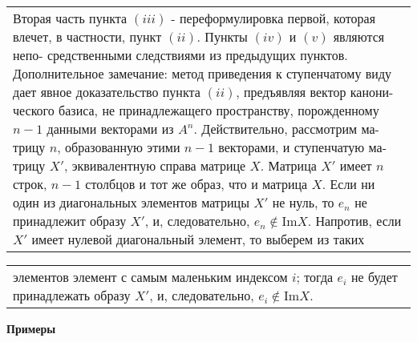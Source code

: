 \documentclass{mai_book}
\begin{document}
\begin{tabular}{|p{13cm}}
	Вторая часть пункта $(iii)$ - переформулировка первой, которая\linebreak
	влечет, в частности, пункт $(ii)$. Пункты $(iv)$ и $(v)$ являются непо-\linebreak
	средственными следствиями из предыдущих пунктов.\linebreak
	Дополнительное замечание: метод приведения к ступенчатому виду\linebreak
	дает явное доказательство пункта $(ii)$, предъявляя вектор канони-\linebreak
	ческого базиса, не принадлежащего пространству, порожденному\linebreak
	$n - 1$ данными векторами из $A^n$. Действительно, рассмотрим ма-\linebreak
	трицу $n$, образованную этими $n - 1$ векторами, и ступенчатую ма-\linebreak
	трицу $X'$, эквивалентную справа матрице $X$. Матрица $X'$ имеет\linebreak
	$n$ строк, $n - 1$ столбцов и тот же образ, что и матрица $X$. Если\linebreak
	ни один из диагональных элементов матрицы $X'$ не нуль, то $e_n$ не\linebreak
	принадлежит образу $X'$, и, следовательно, $e_n \notin$Im$X$. Напротив,\linebreak
	если $X'$ имеет нулевой диагональный элемент, то выберем из таких
	\end{tabular}
	
	\pagebreak
	
	
	\begin{tabular}{|p{12.5cm}}
	\noindent
	элементов элемент с самым маленьким индексом $i$; тогда $e_i$ не будет\linebreak
	принадлежать образу $X'$, и, следовательно, $e_i\notin$Im$X$.
	\end{tabular}
	
	\noindent
	{\bf Примеры}
	
\end{document}
